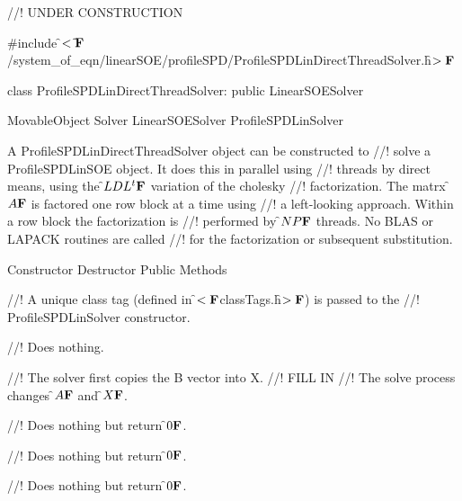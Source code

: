 
//! UNDER CONSTRUCTION

\indent \#include \f$<\tilde{
}{\bf F}$/system\_of\_eqn/linearSOE/profileSPD/ProfileSPDLinDirectThreadSolver.h\f$>{\bf F}$
 

\indent class ProfileSPDLinDirectThreadSolver: public LinearSOESolver

\indent MovableObject
\indent\indent  Solver
\indent\indent\indent LinearSOESolver
\indent\indent\indent\indent ProfileSPDLinSolver
\indent\indent\indent\indent{}

\indent A ProfileSPDLinDirectThreadSolver object can be constructed to
//! solve a ProfileSPDLinSOE object. It does this in parallel using
//! threads by direct means, using the \f$LDL^t{\bf F}$ variation of the cholesky
//! factorization. The matrx \f$A{\bf F}$ is factored one row block at a time using
//! a left-looking approach. Within a row block the factorization is
//! performed by \f$NP{\bf F}$ threads. No BLAS or LAPACK routines are called 
//! for the factorization or subsequent substitution.

\indent\indent Constructor
\indent{}
\indent\indent Destructor
\indent{}
\indent\indent Public Methods
\indent{}
\indent{}
\indent{} 
\indent{} 


//! A unique class tag (defined in \f$<{\bf F}$classTags.h\f$>{\bf F}$) is passed to the
//! ProfileSPDLinSolver constructor.


//! Does nothing.

//! The solver first copies the B vector into X.
//! FILL IN
//! The solve process changes \f$A{\bf F}$ and \f$X{\bf F}$.   

//! Does nothing but return \f$0{\bf F}$.

//! Does nothing but return \f$0{\bf F}$.

//! Does nothing but return \f$0{\bf F}$.







